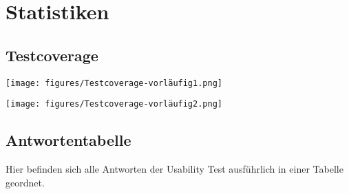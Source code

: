 \section{Statistiken}

\subsection{Testcoverage}

\texttt{[image: figures/Testcoverage-vorläufig1.png]}\par\vspace{1cm}
\texttt{[image: figures/Testcoverage-vorläufig2.png]}\par\vspace{1cm}


\subsection{Antwortentabelle}

Hier befinden sich alle Antworten der Usability Test ausführlich in einer Tabelle geordnet.